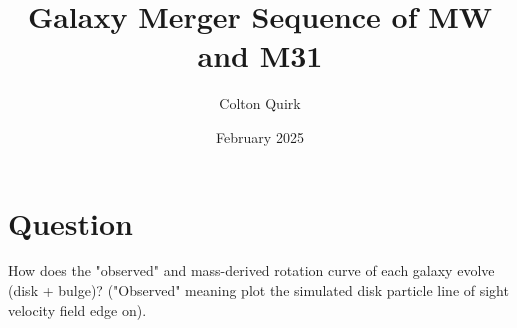 \documentclass{article}
\title{Galaxy Merger Sequence of MW and M31}
\author{Colton Quirk}
\date{February 2025}
\begin{document}
\maketitle

\section{Question}

How does the "observed" and mass-derived rotation curve of each galaxy evolve (disk + bulge)?
("Observed" meaning plot the simulated disk particle line of sight velocity field edge on).
\end{document}
